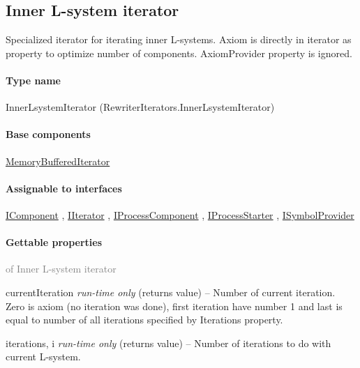 \subsection{Inner L-system iterator}
\label{Malsys.Processing.Components.RewriterIterators.InnerLsystemIterator}
Specialized iterator for iterating inner L-systems.
            Axiom is directly in iterator as property to optimize number of components.
            AxiomProvider property is ignored.\paragraph{Type name}
InnerLsystemIterator (RewriterIterators.InnerLsystemIterator) 	\paragraph{Base components}
		\hyperref[Malsys.Processing.Components.RewriterIterators.MemoryBufferedIterator]{MemoryBufferedIterator}%
	\paragraph{Assignable to interfaces}
		\hyperref[Malsys.Processing.Components.IComponent]{IComponent}%
, 		\hyperref[Malsys.Processing.Components.IIterator]{IIterator}%
, 		\hyperref[Malsys.Processing.Components.IProcessComponent]{IProcessComponent}%
, 		\hyperref[Malsys.Processing.Components.IProcessStarter]{IProcessStarter}%
, 		\hyperref[Malsys.Processing.Components.ISymbolProvider]{ISymbolProvider}%
	\paragraph{Gettable properties}\textcolor{gray}{of Inner L-system iterator}
	\begin{description*}
		\item[currentIteration]
 \textit{run-time only} 		(returns value)
			-- Number of current iteration. Zero is axiom (no iteration was done), first iteration have number 1
            and last is equal to number of all iterations specified by Iterations property.
		\item[iterations, i]
 \textit{run-time only} 		(returns value)
			-- Number of iterations to do with current L-system.
	\end{description*}
